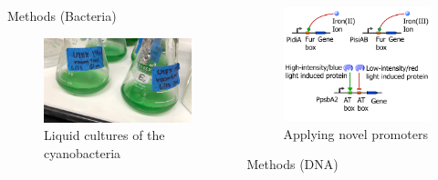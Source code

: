 \documentclass[final]{beamer}
\newlength{\onecolwid}
\newlength{\twocolwid}
\begin{document}
\begin{frame}[t]
\begin{columns}[t]
\begin{column}{\twocolwid}
\begin{columns}[t,totalwidth=\twocolwid]
\begin{column}{\onecolwid}
\begin{block}{Methods (Bacteria)}
\begin{figure}
\includegraphics[width=0.8\linewidth]{realcyanos.jpg}
\caption{Liquid cultures of the cyanobacteria}
\end{figure}

\end{block}

\end{column} %

\begin{column}{\onecolwid} %

\begin{figure}
\includegraphics[width=0.8\linewidth]{Q3.PNG}
\caption{Applying novel promoters}
\end{figure}

\begin{block}{Methods (DNA)}


\end{block}
\end{column}
\end{columns}
\end{column}
\end{columns}
\end{frame}
\end{document}
